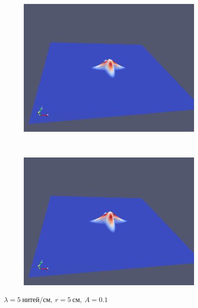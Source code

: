 \begin{figure}[H]
\begin{subfigure}[t]{0.5\textwidth}
        \includegraphics[width=\textwidth]{img/fiber/density_5_radius_5_amplitude_0.1/5.png}
    \end{subfigure}%
    ~
    \begin{subfigure}[t]{0.5\textwidth}
        \centering
        \includegraphics[width=\textwidth]{img/fiber/density_5_radius_5_amplitude_0.1/6.png}
    \end{subfigure}
    \caption{$\lambda=5~нитей/см,~r=5~см,~A=0.1$}
\end{figure}
